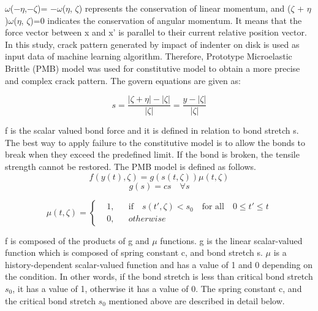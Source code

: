 $\omega$($-\eta$,$-\zeta$)= $-\omega$($\eta$, $\zeta$) represents the conservation of linear momentum, and ($\zeta$ + $\eta$)\times$\omega$($\eta$, $\zeta$)=0 indicates the conservation of angular momentum. It means that the force vector between x and x' is parallel to their current relative position vector. In this study, crack pattern generated by impact of indenter on disk is used as input data of machine learning algorithm. Therefore, Prototype Microelastic Brittle (PMB) model \cite{Ref4} was used for constitutive model to obtain a more precise and complex crack pattern. The govern equations are given as: 

\begin{equation}
s=\frac{|\zeta+\eta|-|\zeta|}{|\zeta|}=\frac{y-|\zeta|}{|\zeta|}
\end{equation}

f is the scalar valued bond force and it is defined in relation to bond stretch s. The best way to apply failure to the constitutive model is to allow the bonds to break when they exceed the predefined limit. If the bond is broken, the tensile strength cannot be restored. The PMB model is defined as follows.
\begin{equation}
f(y(t),\zeta)=g(s(t,\zeta))\mu(t,\zeta)
\end{equation}
\begin{equation}
g(s)=cs \quad\forall s
\end{equation}

\begin{equation}
  \mu(t,\zeta) = \left \{
  \begin{aligned}
    &1, && \textrm{if} \quad s(t',\zeta)<s_0 \quad \textrm{for all} \quad 0 \leq t' \leq t\\
    &0, && otherwise
  \end{aligned} \right.
\end{equation}


f is composed of the products of g and $\mu$ functions. g is the linear scalar-valued function which is composed of spring constant c, and bond stretch s. $\mu$ is a history-dependent scalar-valued function and has a value of 1 and 0 depending on the condition. In other words, if the bond stretch is less than critical bond stretch $s_0$, it has a value of 1, otherwise it has a value of 0. The spring constant c, and the critical bond stretch $s_0$ mentioned above are described in detail below.

